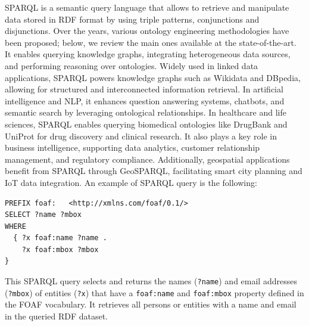 SPARQL is a semantic query language that allows to retrieve and manipulate data stored in RDF format by using triple patterns, conjunctions and disjunctions. Over the years, various ontology engineering methodologies have been proposed; below, we review the main ones available at the state-of-the-art. It enables querying knowledge graphs, integrating heterogeneous data sources, and performing reasoning over ontologies. Widely used in linked data applications, SPARQL powers knowledge graphs such as Wikidata and DBpedia, allowing for structured and interconnected information retrieval. In artificial intelligence and NLP, it enhances question answering systems, chatbots, and semantic search by leveraging ontological relationships. In healthcare and life sciences, SPARQL enables querying biomedical ontologies like DrugBank and UniProt for drug discovery and clinical research. It also plays a key role in business intelligence, supporting data analytics, customer relationship management, and regulatory compliance. Additionally, geospatial applications benefit from SPARQL through GeoSPARQL, facilitating smart city planning and IoT data integration. An example of SPARQL query is the following:
\begin{lstlisting}
PREFIX foaf:   <http://xmlns.com/foaf/0.1/>
SELECT ?name ?mbox
WHERE
  { ?x foaf:name ?name .
    ?x foaf:mbox ?mbox 
}    
\end{lstlisting}
This SPARQL query selects and returns the names (\texttt{?name}) and email addresses (\texttt{?mbox}) of entities (\texttt{?x}) that have a \texttt{foaf:name} and \texttt{foaf:mbox} property defined in the FOAF vocabulary. It retrieves all persons or entities with a name and email in the queried RDF dataset.


